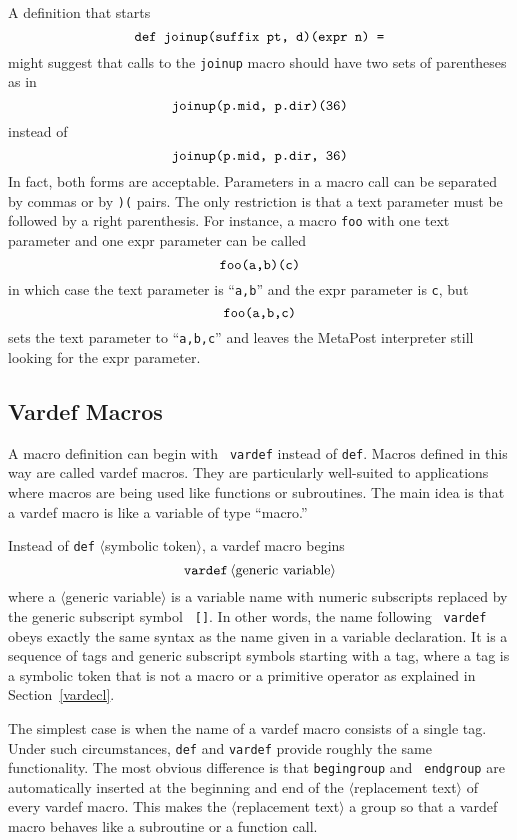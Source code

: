\documentclass{article} %
\newcommand\descr[1]{{\langle\hbox{#1}\rangle}}
\newcommand\invisgap{\nobreak\hskip0pt\relax}
\newcommand\tdescr[1]{$\langle$\invisgap#1\invisgap$\rangle$}
\begin{document}
A definition that starts
$$ \hbox{\tt def joinup(suffix pt, d)(expr n) =} $$
might suggest that calls to the {\tt joinup} macro should have two sets of
parentheses as in
$$ \hbox{\tt joinup(p.mid, p.dir)(36)} $$
instead of
$$ \hbox{\tt joinup(p.mid, p.dir, 36)} $$
In fact, both forms are acceptable.  Parameters in a macro call can be
separated by commas or by {\tt )(} pairs.  The only restriction is that
a text parameter must be followed by a right
parenthesis.  For instance, a macro {\tt foo} with one text parameter
and one expr parameter can be called
$$ \hbox{\tt foo(a,b)(c)} $$
in which case the text parameter is ``{\tt a,b}'' and the expr parameter is
{\tt c}, but
$$ \hbox{\tt foo(a,b,c)} $$
sets the text parameter to ``{\tt a,b,c}'' and leaves the MetaPost interpreter
still looking for the expr parameter.


\subsection{Vardef Macros}

A macro definition can begin with {\tt
vardef} instead of {\tt def}.  Macros
defined in this way are called vardef macros.  They are particularly
well-suited to applications where macros are being used like functions
or subroutines.  The main idea is that a vardef macro is like a variable
of type ``macro.''

Instead of {\tt def} \tdescr{symbolic token}, a vardef macro begins
$$ {\tt vardef}\, \descr{generic variable} $$
where a \tdescr{generic variable}\index{generic variable?\tdescr{generic
variable}} is a variable name with numeric subscripts replaced by the
generic subscript symbol {\tt
[]}.  In other words, the name following {\tt
vardef} obeys exactly the same syntax as the name given in a variable
declaration.  It is a sequence of tags and generic subscript symbols
starting with a tag, where a tag is a symbolic token that is
not a macro or a primitive operator as explained in
Section~\ref{vardecl}.

The simplest case is when the name of a vardef macro consists of a
single tag.  Under such circumstances, {\tt def} and {\tt vardef}
provide roughly the same functionality.  The most obvious difference is
that {\tt begingroup} and {\tt
endgroup} are automatically inserted
at the beginning and end of the \tdescr{replacement text} of every
vardef macro.  This makes the \tdescr{replacement text} a group so that
a vardef macro behaves like a subroutine or a function call.
\end{document}
